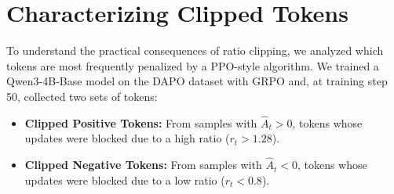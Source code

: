   
  


\section{Characterizing Clipped Tokens}  
\label{app:clipped_tokens}  
  
To understand the practical consequences of ratio clipping, we analyzed which tokens are most frequently penalized by a PPO-style algorithm. We trained a Qwen3-4B-Base model on the DAPO dataset with GRPO and, at training step 50, collected two sets of tokens:  
\begin{itemize}  
    \item \textbf{Clipped Positive Tokens:} From samples with $\hat{A}_t > 0$, tokens whose updates were blocked due to a high ratio ($r_t > 1.28$).  
    \item \textbf{Clipped Negative Tokens:} From samples with $\hat{A}_t < 0$, tokens whose updates were blocked due to a low ratio ($r_t < 0.8$).  
\end{itemize}  
  

